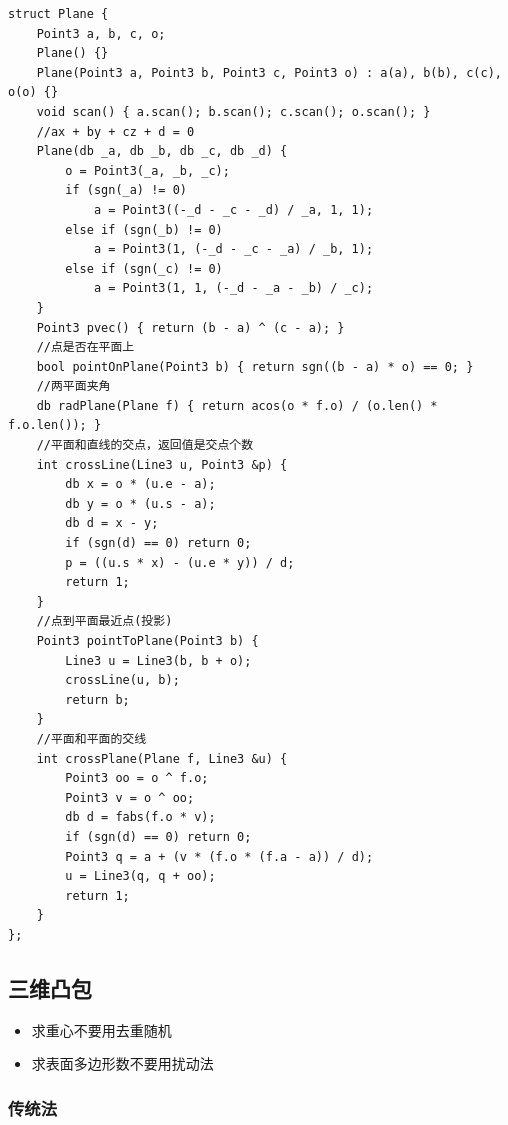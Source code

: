 \begin{lstlisting}
struct Plane {
	Point3 a, b, c, o;
	Plane() {}
	Plane(Point3 a, Point3 b, Point3 c, Point3 o) : a(a), b(b), c(c), o(o) {}
	void scan() { a.scan(); b.scan(); c.scan(); o.scan(); }
	//ax + by + cz + d = 0
	Plane(db _a, db _b, db _c, db _d) {
		o = Point3(_a, _b, _c);
		if (sgn(_a) != 0) 
			a = Point3((-_d - _c - _d) / _a, 1, 1);
		else if (sgn(_b) != 0)
			a = Point3(1, (-_d - _c - _a) / _b, 1);
		else if (sgn(_c) != 0)
			a = Point3(1, 1, (-_d - _a - _b) / _c);
	}
	Point3 pvec() { return (b - a) ^ (c - a); }
	//点是否在平面上
	bool pointOnPlane(Point3 b) { return sgn((b - a) * o) == 0; }
	//两平面夹角
	db radPlane(Plane f) { return acos(o * f.o) / (o.len() * f.o.len()); }
	//平面和直线的交点，返回值是交点个数
	int crossLine(Line3 u, Point3 &p) {
		db x = o * (u.e - a);
		db y = o * (u.s - a);
		db d = x - y;
		if (sgn(d) == 0) return 0;
		p = ((u.s * x) - (u.e * y)) / d;
		return 1;
	}
	//点到平面最近点(投影)
	Point3 pointToPlane(Point3 b) {
		Line3 u = Line3(b, b + o);
		crossLine(u, b);
		return b;
	}
	//平面和平面的交线
	int crossPlane(Plane f, Line3 &u) {
		Point3 oo = o ^ f.o;
		Point3 v = o ^ oo;
		db d = fabs(f.o * v);
		if (sgn(d) == 0) return 0;
		Point3 q = a + (v * (f.o * (f.a - a)) / d);
		u = Line3(q, q + oo);
		return 1;
	}
};
\end{lstlisting}


\subsection{三维凸包}

\begin{itemize}
\item 求重心不要用去重随机
\item 求表面多边形数不要用扰动法
\end{itemize}

\subsubsection{传统法}

